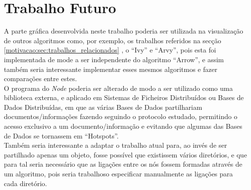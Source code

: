 \section{Trabalho Futuro}
\label{sec:trab-futuro}
A parte gráfica desenvolvida neste trabalho poderia ser utilizada na visualização de outros algoritmos como,
por exemplo, os trabalhos referidos na secção \ref{motivacao:sec:trabalhos_relacionados}
, o ``Ivy'' e ``Arvy'', pois esta foi implementada de mode a ser independente do algoritmo ``Arrow'',
e assim também seria interessante implementar esses mesmos algoritmos e fazer comparações entre estes. \\

\noindent O programa do \emph{Node} poderia ser alterado de modo a ser utilizado como uma biblioteca externa,
e aplicado em Sistemas de Ficheiros Distribuídos ou Bases de Dados Distribuídas,
em que as várias Bases de Dados partilhariam documentos/informações fazendo seguindo o protocolo estudado,
permitindo o acesso exclusivo a um documento/informação e evitando que algumas das Bases de Dados se tornassem em ``Hotspots''. \\

\noindent Também seria interessante a adaptar o trabalho atual para, ao invés de ser partilhado apenas um objeto, fosse possível que existissem vários diretórios, 
e que para tal seria necessário que as ligações entre os nós fossem formadas através de um algoritmo,
pois seria trabalhoso especificar manualmente as ligações para cada diretório. \\



